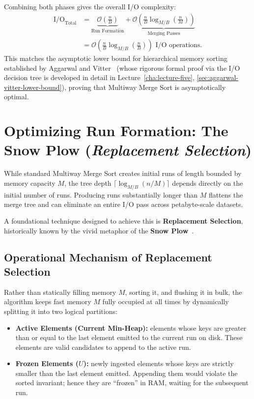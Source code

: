 Combining both phases gives the overall I/O complexity:
\begin{equation}
  \begin{aligned}
    \mathrm{I/O}_{\text{Total}}
    &= \underbrace{\mathcal{O}\left(\frac{n}{B}\right)}_{\text{Run Formation}} + \underbrace{\mathcal{O}\left(\frac{n}{B} \log_{M/B}\left(\frac{n}{M}\right)\right)}_{\text{Merging Passes}} \\
    &= \mathcal{O}\left(\frac{n}{B} \log_{M/B}\left(\frac{n}{B}\right)\right) \text{ I/O operations}.
  \end{aligned}
\end{equation}
This matches the asymptotic lower bound for hierarchical memory sorting established by Aggarwal and Vitter~\cite{aggarwal1988} (whose rigorous formal proof via the I/O decision tree is developed in detail in Lecture~\ref{cha:lecture-five}, \autoref{sec:aggarwal-vitter-lower-bound}), proving that Multiway Merge Sort is asymptotically optimal.

\section{Optimizing Run Formation: The Snow Plow (\texorpdfstring{\emph{Replacement Selection}}{Replacement Selection})}
\label{sec:snow-plow}

While standard Multiway Merge Sort creates initial runs of length bounded by memory capacity $M$, the tree depth $\lceil \log_{M/B}(n/M) \rceil$ depends directly on the initial number of runs. Producing runs substantially longer than $M$ flattens the merge tree and can eliminate an entire I/O pass across petabyte-scale datasets.

A foundational technique designed to achieve this is \textbf{Replacement Selection}, historically known by the vivid metaphor of the \textbf{Snow Plow}~\cite{knuth1997}.

\subsection{Operational Mechanism of Replacement Selection}
\label{subsec:snow-plow-mechanism}

Rather than statically filling memory $M$, sorting it, and flushing it in bulk, the algorithm keeps fast memory $M$ fully occupied at all times by dynamically splitting it into two logical partitions:
\begin{itemize}
  \item \textbf{Active Elements (Current Min-Heap):} elements whose keys are greater than or equal to the last element emitted to the current run on disk. These elements are valid candidates to append to the active run.
  \item \textbf{Frozen Elements ($U$):} newly ingested elements whose keys are strictly smaller than the last element emitted. Appending them would violate the sorted invariant; hence they are ``frozen'' in RAM, waiting for the subsequent run.
\end{itemize}

